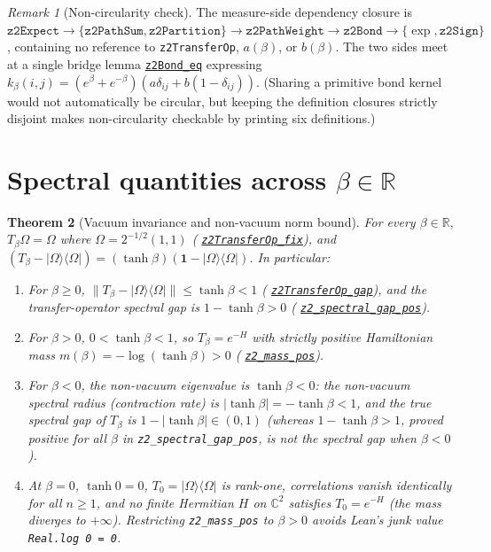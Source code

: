 \documentclass[11pt]{article}
\newtheorem{theorem}{Theorem}[section]
\theoremstyle{remark}
\newtheorem{remark}[theorem]{Remark}
\theoremstyle{definition}
\newcommand{\lean}[1]{\texttt{#1}}
\newcommand{\anchor}{bd2c18394ce8a55ec73413c11a9f311bbf002248}
\newcommand{\osline}[3]{%
  \href{https://github.com/lluiseriksson/THE-ERIKSSON-PROGRAMME/blob/\anchor/YangMills/OS/#1.lean\#L#2}{\nolinkurl{#3}}}
\newcommand{\R}{\mathbb{R}}
\newcommand{\C}{\mathbb{C}}
\newcommand{\Om}{\Omega}
\newcommand{\ket}[1]{|#1\rangle}
\newcommand{\bra}[1]{\langle #1|}
\begin{document}
\begin{remark}[Non-circularity check]
The measure-side dependency closure is
$\texttt{z2Expect} \to \{\texttt{z2PathSum}, \texttt{z2Partition}\} \to
\texttt{z2PathWeight} \to \texttt{z2Bond} \to \{\exp, \texttt{z2Sign}\}$,
containing no reference to \lean{z2TransferOp}, $a(\beta)$, or $b(\beta)$. The two sides
meet at a single bridge lemma \osline{Z2Identification}{118}{z2Bond\_eq} expressing
$k_\beta(i,j) = (e^\beta+e^{-\beta})(a\delta_{ij} + b(1-\delta_{ij}))$.
(Sharing a primitive bond kernel would not automatically be circular, but keeping the
definition closures strictly disjoint makes non-circularity checkable by printing six
definitions.)
\end{remark}

\section{Spectral quantities across $\beta \in \R$}

\begin{theorem}[Vacuum invariance and non-vacuum norm bound]\label{thm:gap}
For every $\beta \in \R$, $T_\beta \Om = \Om$ where $\Om = 2^{-1/2}(1,1)$
(\osline{Z2Transfer}{189}{z2TransferOp\_fix}), and
$(T_\beta - \ket{\Om}\bra{\Om}) = (\tanh\beta)(\mathbf{1} - \ket{\Om}\bra{\Om})$.
In particular:
\begin{enumerate}
  \item For $\beta \ge 0$, $\|T_\beta - \ket{\Om}\bra{\Om}\| \le \tanh\beta < 1$
  (\osline{Z2Transfer}{261}{z2TransferOp\_gap}), and the transfer-operator spectral gap is
  $1 - \tanh\beta > 0$ (\osline{Z2Transfer}{331}{z2\_spectral\_gap\_pos}).
  \item For $\beta > 0$, $0 < \tanh\beta < 1$, so $T_\beta = e^{-H}$ with strictly positive
  Hamiltonian mass $m(\beta) = -\log(\tanh\beta) > 0$ (\osline{Z2Transfer}{348}{z2\_mass\_pos}).
  \item For $\beta < 0$, the non-vacuum eigenvalue is $\tanh\beta < 0$: the non-vacuum
  spectral radius (contraction rate) is $|\tanh\beta| = -\tanh\beta < 1$, and the true
  spectral gap of $T_\beta$ is $1 - |\tanh\beta| \in (0,1)$ (whereas $1 - \tanh\beta > 1$,
  proved positive for all $\beta$ in \lean{z2\_spectral\_gap\_pos}, is \emph{not} the
  spectral gap when $\beta < 0$).
  \item At $\beta = 0$, $\tanh 0 = 0$, $T_0 = \ket{\Om}\bra{\Om}$ is rank-one, correlations
  vanish identically for all $n \ge 1$, and no finite Hermitian $H$ on $\C^2$ satisfies
  $T_0 = e^{-H}$ (the mass diverges to $+\infty$). Restricting \lean{z2\_mass\_pos} to
  $\beta > 0$ avoids Lean's junk value \lean{Real.log 0 = 0}.
\end{enumerate}
\end{theorem}
\end{document}
